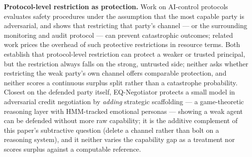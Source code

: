 \documentclass[11pt]{article}
\begin{document}
\textbf{Protocol-level restriction as protection.} Work on AI-control protocols \citep{AIControl} evaluates safety procedures under the assumption that the most capable party is adversarial, and shows that restricting that party's channel --- or the surrounding monitoring and audit protocol --- can prevent catastrophic outcomes; related work \citep{ControlTax} prices the overhead of such protective restrictions in resource terms. Both establish that protocol-level restriction can protect a weaker or trusted principal, but the restriction always falls on the strong, untrusted side; neither asks whether restricting the weak party's own channel offers comparable protection, and neither scores a continuous surplus split rather than a catastrophe probability. Closest on the defended party itself, EQ-Negotiator \citep{EQNegotiator2511} protects a small model in adversarial credit negotiation by \emph{adding} strategic scaffolding --- a game-theoretic reasoning layer with HMM-tracked emotional personas --- showing a weak agent can be defended without more raw capability; it is the additive complement of this paper's subtractive question (delete a channel rather than bolt on a reasoning system), and it neither varies the capability gap as a treatment nor scores surplus against a computable reference.
\end{document}
